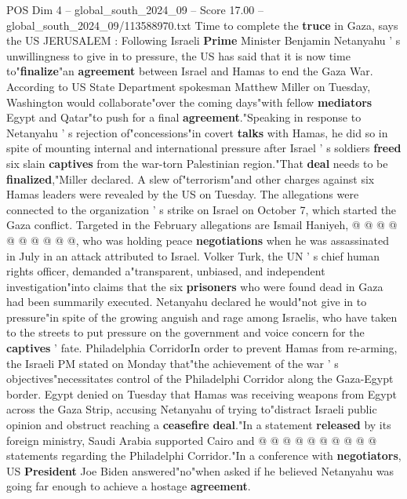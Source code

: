 \begin{textsample}{POS Dim 4 – global\_south\_2024\_09 – Score 17.00 – global\_south\_2024\_09/113588970.txt}  \label{ex:f4_pos_299}
Time to complete the \textbf{truce} in Gaza, says the US JERUSALEM : Following Israeli \textbf{Prime} Minister Benjamin Netanyahu ' s unwillingness to give in to pressure, the US has said that it is now time to"\textbf{finalize}"an \textbf{agreement} between Israel and Hamas to end the Gaza War.
According to US State Department spokesman Matthew Miller on Tuesday, Washington would collaborate"over the coming days"with fellow \textbf{mediators} Egypt and Qatar"to push for a final \textbf{agreement}."Speaking in response to Netanyahu ' s rejection of"concessions"in covert \textbf{talks} with Hamas, he did so in spite of mounting internal and international pressure after Israel ' s soldiers \textbf{freed} six slain \textbf{captives} from the war-torn Palestinian region."That \textbf{deal} needs to be \textbf{finalized},"Miller declared.
A slew of"terrorism"and other charges against six Hamas leaders were revealed by the US on Tuesday.
The allegations were connected to the organization ' s strike on Israel on October 7, which started the Gaza conflict.
Targeted in the February allegations are Ismail Haniyeh, @ @ @ @ @ @ @ @ @ @, who was holding peace \textbf{negotiations} when he was assassinated in July in an attack attributed to Israel.
Volker Turk, the UN ' s chief human rights officer, demanded a"transparent, unbiased, and independent investigation"into claims that the six \textbf{prisoners} who were found dead in Gaza had been summarily executed.
Netanyahu declared he would"not give in to pressure"in spite of the growing anguish and rage among Israelis, who have taken to the streets to put pressure on the government and voice concern for the \textbf{captives} ' fate.
Philadelphia CorridorIn order to prevent Hamas from re-arming, the Israeli PM stated on Monday that"the achievement of the war ' s objectives"necessitates control of the Philadelphi Corridor along the Gaza-Egypt border.
Egypt denied on Tuesday that Hamas was receiving weapons from Egypt across the Gaza Strip, accusing Netanyahu of trying to"distract Israeli public opinion and obstruct reaching a \textbf{ceasefire} \textbf{deal}."In a statement \textbf{released} by its foreign ministry, Saudi Arabia supported Cairo and @ @ @ @ @ @ @ @ @ @ statements regarding the Philadelphi Corridor."In a conference with \textbf{negotiators}, US \textbf{President} Joe Biden answered"no"when asked if he believed Netanyahu was going far enough to achieve a hostage \textbf{agreement}.

\end{textsample}
